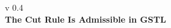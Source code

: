 \documentclass[a4paper, 12pt]{paper}
\begin{document}
{\noindent
	v 0.4 \\
{\large\textbf{The Cut Rule Is Admissible in GSTL}}
}
\\
\setcounter{section}{-1}




\end{document}
